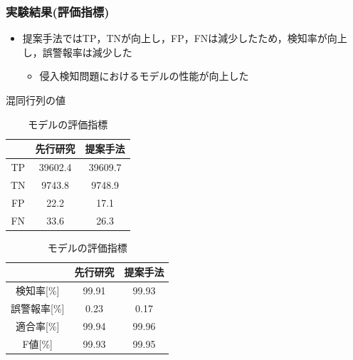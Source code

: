 \documentclass[11pt,dvipdfmx,cjk]{beamer}
\begin{document}
\begin{frame}
  \frametitle{実験結果(評価指標)}
  \begin{itemize}
    \item 提案手法ではTP，TNが向上し，FP，FNは減少したため，検知率が向上し，誤警報率は減少した
      \begin{itemize}
        \item 侵入検知問題におけるモデルの性能が向上した
      \end{itemize}
    \end{itemize}
  
  \begin{table}[h]
    \centering
    \begin{minipage}{0.48\textwidth}  %
      \scriptsize
        \centering
        \caption{混同行列の値}  %
        \begin{tabular}{|c|c|c|}  %
            \hline  %
            ~ &先行研究 & 提案手法\\  %
            \hline  %
            TP & 39602.4 & 39609.7\\  %
            \hline  %
            TN & 9743.8 & 9748.9\\  %
            \hline  %
            FP & 22.2 & 17.1\\  %
            \hline  %
            FN & 33.6 & 26.3\\  %
            \hline  %
        \end{tabular}
        \label{result2}  %
    \end{minipage} \hspace{0.2cm}  %
    \begin{minipage}{0.48\textwidth}  %
      \scriptsize
        \centering
        \caption{モデルの評価指標}  %
        \begin{tabular}{|c|c|c|}  %
            \hline  %
            ~ &先行研究 & 提案手法\\  %
            \hline  %
            検知率[\%] & 99.91 & 99.93\\  %
            \hline  %
            誤警報率[\%] & 0.23 & 0.17\\  %
            \hline  %
            適合率[\%] & 99.94 & 99.96\\  %
            \hline  %
            F値[\%] & 99.93 & 99.95\\  %
            \hline  %
        \end{tabular}
        \label{result3}  %
    \end{minipage}
  \end{table}
\end{frame}
\end{document}
